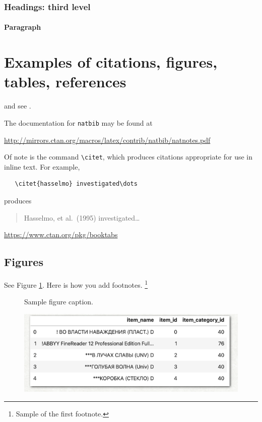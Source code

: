 \documentclass{article}
\begin{document}
\subsubsection{Headings: third level}
\lipsum[6]

\paragraph{Paragraph}
\lipsum[7]

\section{Examples of citations, figures, tables, references}
\label{sec:others}
\lipsum[8] \cite{kour2014real,kour2014fast} and see \cite{hadash2018estimate}.

The documentation for \verb+natbib+ may be found at
\begin{center}
  \url{http://mirrors.ctan.org/macros/latex/contrib/natbib/natnotes.pdf}
\end{center}
Of note is the command \verb+\citet+, which produces citations
appropriate for use in inline text.  For example,
\begin{verbatim}
   \citet{hasselmo} investigated\dots
\end{verbatim}
produces
\begin{quote}
  Hasselmo, et al.\ (1995) investigated\dots
\end{quote}

\begin{center}
  \url{https://www.ctan.org/pkg/booktabs}
\end{center}


\subsection{Figures}
\lipsum[10]
See Figure \ref{fig:fig1}. Here is how you add footnotes. \footnote{Sample of the first footnote.}
\lipsum[11]

\begin{figure}
  \centering
  \fbox{\rule[-.5cm]{4cm}{4cm} \rule[-.5cm]{4cm}{0cm}}
  \caption{Sample figure caption.}
  \label{fig:fig1}
\end{figure}

\begin{figure} %
  \centering
  \includegraphics{test.png}
\end{figure}
\end{document}
